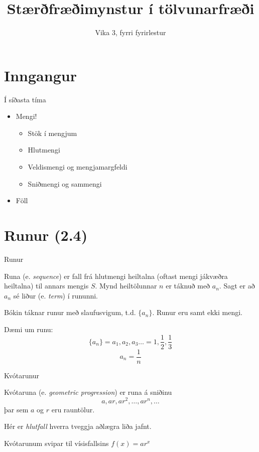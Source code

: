 \documentclass[handout]{beamer}
\title{Stærðfræðimynstur í tölvunarfræði}
\subtitle{Vika 3, fyrri fyrirlestur}
\begin{document}
\begin{frame}
\titlepage
\end{frame}

\section{Inngangur}

\begin{frame}{Í síðasta tíma}
\begin{itemize}
 \item Mengi!
 \begin{itemize}
  \item Stök í mengjum
  \item Hlutmengi
  \item Veldismengi og mengjamargfeldi
  \item Sniðmengi og sammengi
 \end{itemize}
 \item Föll 
\end{itemize}
\end{frame}

\section{Runur (2.4)}

\begin{frame}{Runur}
\begin{tcolorbox}[title=Runur]
Runa (e. \emph{sequence}) er fall frá hlutmengi heiltalna (oftast mengi jákvæðra heiltalna) til annars mengis $S$. Mynd heiltölunnar $n$ er táknuð með $a_n$. Sagt er að $a_n$ sé liður (e. \emph{term}) í rununni.
\end{tcolorbox}
Bókin táknar runur með slaufusvigum, t.d. $\{a_n\}$. Runur eru samt ekki mengi.

Dæmi um runu:
\[
 \{a_n\} = a_1, a_2, a_3 \ldots = 1, \frac{1}{2}, \frac{1}{3}
\]
\[
 a_n = \frac{1}{n}
\]
\end{frame}

\begin{frame}{Kvótarunur}
    \begin{tcolorbox}[title=Kvótarunur]
        Kvótaruna (e. \emph{geometric progression}) er runa á sniðinu
        \[
            a, ar, ar^2, \ldots, ar^n, \ldots
        \]
        þar sem $a$ og $r$ eru rauntölur.
    \end{tcolorbox}
    Hér er \emph{hlutfall} hverra tveggja aðlægra liða jafnt.

    \vspace{0.5cm}
    Kvótarunum svipar til vísisfallsins $f(x) = ar^x$
\end{frame}
\end{document}
